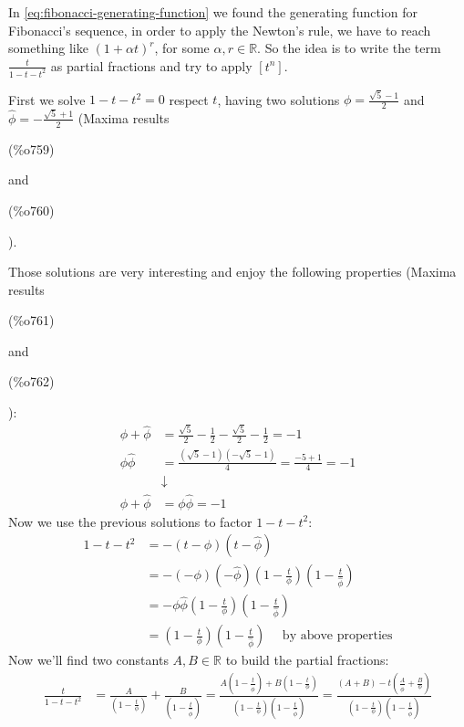 In \autoref{eq:fibonacci-generating-function} we found the generating
function for Fibonacci's sequence, in order to apply the Newton's
rule, we have to reach something like $(1 + \alpha t)^r$, for some
$\alpha, r \in \mathbb{R} $. So the idea is to write the term
$\frac{t}{1-t-t^2}$ as partial fractions and try to apply $[t^{n}]$.

First we solve $1-t-t^2 = 0$ respect $t$, having two solutions
$\phi=\frac{\sqrt{5}-1}{2}$ and $\hat{\phi}=-\frac{\sqrt{5}+1}{2}$
(Maxima results \parbox{8ex}{\color{labelcolor}(\%o759) }
and \parbox{8ex}{\color{labelcolor}(\%o760) }).

Those solutions are very interesting and enjoy the following
properties (Maxima results \parbox{8ex}{\color{labelcolor}(\%o761) }
and \parbox{8ex}{\color{labelcolor}(\%o762) }):
\begin{displaymath}
  \begin{split}
    \phi + \hat{\phi} &= \frac{\sqrt{5}}{2} - \frac{1}{2} -
    \frac{\sqrt{5}}{2} - \frac{1}{2} = -1\\
    \phi \hat{\phi} &= \frac{(\sqrt{5} -1)(-\sqrt{5} -1)}{4} =
    \frac{-5+1}{4} = -1\\
    &\downarrow\\
    \phi + \hat{\phi} &= \phi \hat{\phi} = -1
  \end{split}
\end{displaymath}
Now we use the previous solutions to factor $1-t-t^2$:
\begin{displaymath}
  \begin{split}
    1-t-t^2 &= -\left( t-\phi \right)\left( t-\hat{\phi} \right)\\
    &= -(-\phi)(-\hat{\phi})\left(1 - \frac{t}{\phi} \right)
    \left(1 - \frac{t}{\hat{\phi}} \right)\\
    &= -\phi\hat{\phi}\left(1 - \frac{t}{\phi} \right)
    \left(1 - \frac{t}{\hat{\phi}} \right)\\
    &= \left(1 - \frac{t}{\phi} \right) \left(1 - \frac{t}{\hat{\phi}}
    \right) \quad \text{ by above properties}
  \end{split}
\end{displaymath}
Now we'll find two constants $A, B \in \mathbb{R} $ to build the
partial fractions:
\begin{displaymath}
  \begin{split}
    \frac{t}{1-t-t^2} &= \frac{A}{\left(1 - \frac{t}{\phi} \right)} +
    \frac{B}{ \left(1 - \frac{t}{\hat{\phi}} \right)}= \frac{A \left(1
        - \frac{t}{\hat{\phi}} \right) + B\left(1 - \frac{t}{\phi}
      \right)}{\left(1 - \frac{t}{\phi} \right) \left(1 -
        \frac{t}{\hat{\phi}} \right)} = \frac{(A+B) -t
      \left(\frac{A}{\hat{\phi}} +\frac{B}{\phi}
      \right)}{\left(1 - \frac{t}{\phi} \right) \left(1 -
        \frac{t}{\hat{\phi}} \right)}
  \end{split}
\end{displaymath}
